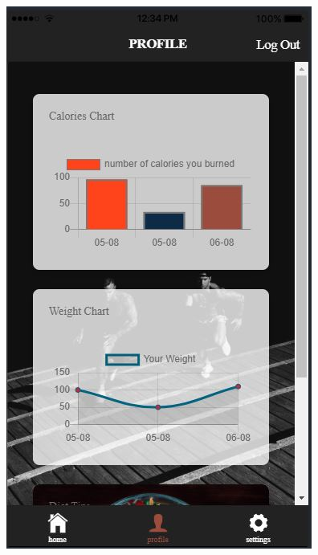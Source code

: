 \documentclass[a4paper,12pt]{article}
\begin{document}
\begin{figure}[!htb]
			  \includegraphics[width=\linewidth]{profile4}
			\endminipage\hfill

\end{figure}
\end{document}

